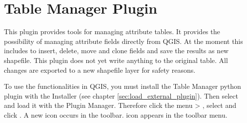 
\section{Table Manager Plugin}\label{sec:ftools}


This plugin provides tools for managing attribute tables. It provides the 
possibility of managing attribute fields directly from QGIS. At the moment 
this includes to insert, delete, move and clone fields and save the results 
as new shapefile. This plugin does not yet write anything to the original 
table. All changes are exported to a new shapefile layer for safety reasons.


To use the functionalities in QGIS, you must install the Table Manager python 
plugin with the  Installer (see chapter 
\ref{sec:load_external_plugin}). Then select and load it with the Plugin Manager. 
Therefore click the menu  > 
, select  and click 
. A new  icon occurs 
in the toolbar. icon appears in the toolbar menu.





